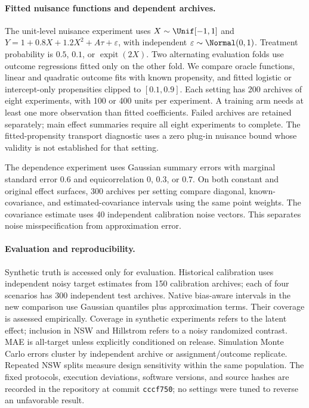 \paragraph{Fitted nuisance functions and dependent archives.}
The unit-level nuisance experiment uses $X\sim\Unif[-1,1]$ and $Y=1+0.8X+1.2X^2+A\tau+\varepsilon$, with independent $\varepsilon\sim\Normal(0,1)$. Treatment probability is $0.5$, $0.1$, or $\operatorname{expit}(2X)$. Two alternating evaluation folds use outcome regressions fitted only on the other fold. We compare oracle functions, linear and quadratic outcome fits with known propensity, and fitted logistic or intercept-only propensities clipped to $[0.1,0.9]$. Each setting has 200 archives of eight experiments, with 100 or 400 units per experiment. A training arm needs at least one more observation than fitted coefficients. Failed archives are retained separately; main effect summaries require all eight experiments to complete. The fitted-propensity transport diagnostic uses a zero plug-in nuisance bound whose validity is not established for that setting.

The dependence experiment uses Gaussian summary errors with marginal standard error $0.6$ and equicorrelation $0$, $0.3$, or $0.7$. On both constant and original effect surfaces, 300 archives per setting compare diagonal, known-covariance, and estimated-covariance intervals using the same point weights. The covariance estimate uses 40 independent calibration noise vectors. This separates noise misspecification from approximation error.

\paragraph{Evaluation and reproducibility.}
Synthetic truth is accessed only for evaluation. Historical calibration uses independent noisy target estimates from 150 calibration archives; each of four scenarios has 300 independent test archives. Native bias-aware intervals in the new comparison use Gaussian quantiles plus approximation terms. Their coverage is assessed empirically. Coverage in synthetic experiments refers to the latent effect; inclusion in NSW and Hillstrom refers to a noisy randomized contrast. MAE is all-target unless explicitly conditioned on release. Simulation Monte Carlo errors cluster by independent archive or assignment/outcome replicate. Repeated NSW splits measure design sensitivity within the same population. The fixed protocols, execution deviations, software versions, and source hashes are recorded in the repository at commit \texttt{cccf750}; no settings were tuned to reverse an unfavorable result.

